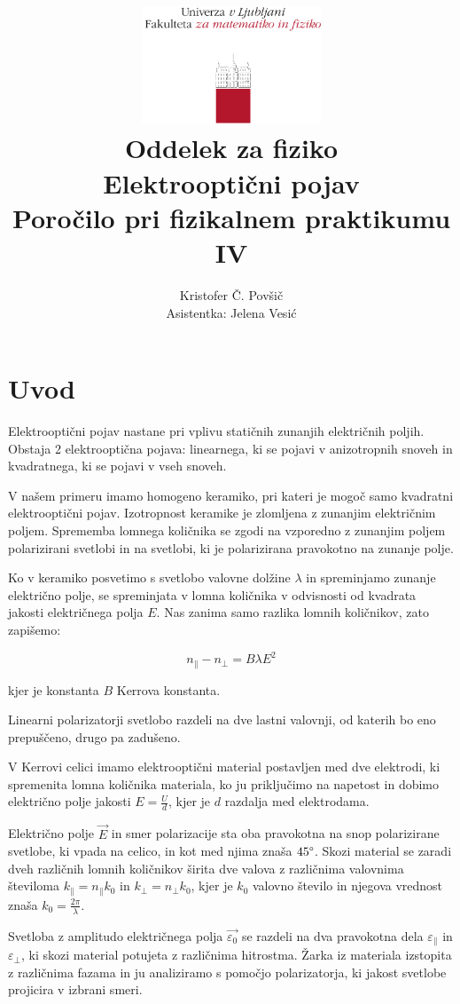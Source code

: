 \documentclass[12pt]{report}
\title{
  \includegraphics[width=0.4\textwidth]{fmf_logo}\\
  {\small Oddelek za fiziko} \\
  {Elektrooptični pojav}\\
  {\small Poročilo pri fizikalnem praktikumu IV}\\

}
\date{}
\author{ Kristofer Č. Povšič \\[5 cm]
 \small Asistentka: Jelena Vesić\\
}
\begin{document}
\setcounter{page}{2}

\maketitle

\chapter*{Uvod}

Elektrooptični pojav nastane pri vplivu statičnih zunanjih električnih poljih. Obstaja 2 elektrooptična pojava: linearnega, ki se pojavi v anizotropnih snoveh in kvadratnega, ki se pojavi v vseh snoveh. 

V našem primeru imamo homogeno keramiko, pri kateri je mogoč samo kvadratni elektrooptični pojav. Izotropnost keramike je zlomljena z zunanjim električnim poljem. Sprememba lomnega količnika se zgodi na vzporedno z zunanjim poljem polarizirani svetlobi in na svetlobi, ki je polarizirana pravokotno na zunanje polje. 

Ko v keramiko posvetimo s svetlobo valovne dolžine $\lambda$ in spreminjamo zunanje električno polje, se spreminjata v lomna količnika v odvisnosti od kvadrata jakosti električnega polja $E$. Nas zanima samo razlika lomnih količnikov, zato zapišemo: 

\begin{equation}
  n_{\|} - n_{\perp} = B \lambda E^2
\end{equation}

kjer je konstanta $B$ Kerrova konstanta. 

Linearni polarizatorji svetlobo razdeli na dve lastni valovnji, od katerih bo eno prepuščeno, drugo pa zadušeno. 

V Kerrovi celici imamo elektrooptični material postavljen med dve elektrodi, ki spremenita lomna količnika materiala, ko ju priključimo na napetost in dobimo električno polje jakosti $E = \frac{U}{d}$, kjer je $d$ razdalja med elektrodama. 

Električno polje $\vec{E}$ in smer polarizacije sta oba pravokotna na snop polarizirane svetlobe, ki vpada na celico, in kot med njima znaša $45\degree$. Skozi material se zaradi dveh različnih lomnih količnikov širita dve valova z različnima valovnima številoma $k_{\|}=n_{\|}k_0$ in $k_{\perp} = n_{\perp}k_0$, kjer je $k_0$ valovno število in njegova vrednost znaša $k_0 = \frac{2\pi}{\lambda}$. 

Svetloba z amplitudo električnega polja $\vec{\varepsilon_0}$ se razdeli na dva pravokotna dela $\varepsilon_{\|}$ in $\varepsilon_{\perp}$, ki skozi material potujeta z različnima hitrostma. Žarka iz materiala izstopita z različnima fazama in ju analiziramo s pomočjo polarizatorja, ki jakost svetlobe projicira v izbrani smeri. 
\end{document}
